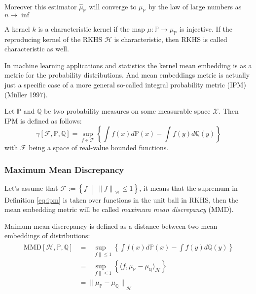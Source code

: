Moreover this estimator $\hat{\mu}_{\mathds{P}}$  will converge to $\mu_{\mathds{P}}$ by the law of large numbers as $n \rightarrow \inf$

\begin{definition}
    A kernel $k$ is a characteristic kernel if the map $\mu: \mathds{P} \rightarrow \mu_{\mathds{P}}$ is injective. If the reproducing kernel of the RKHS $\mathscr{H}$ is characteristic, then RKHS is called characteristic as well. 
\end{definition}

In machine learning applications and statistics the kernel mean embedding is as a metric for the probability distributions. And mean embeddings metric is actually just a specific case of a more general so-called integral probability metric (IPM) (Müller 1997). 

\begin{definition}[IPM]
    Let $\mathds{P}$ and  $\mathds{Q}$ be two probability measures on some measurable space $\mathcal{X}$. Then IPM is defined as follows:
    \begin{equation}
        \gamma [\mathcal{F}, \mathds{P}, \mathds{Q}] = \sup_{f\in \mathcal{F}} \left\{ \int f(x) d\mathds{P}(x) -  \int f(y) d\mathds{Q}(y) \right\}
    \end{equation}
    with $\mathcal{F}$ being a space of real-value bounded functions.
    \label{eq:ipm}
\end{definition}

\subsubsection{Maximum Mean Discrepancy}

Let's assume that $\mathcal{F} := \left\{f \;\middle| \;{\lVert f \rVert}_{\mathscr{H}} \leq 1\right\}$, it means that the supremum in Definition \ref{eq:ipm} is taken over functions in the unit ball in RKHS, then the mean embedding metric will be called \textit{maximum mean discrepancy} (MMD). 

\begin{definition}[IPM]
    Maimum mean discrepancy is defined as a distance between two mean embeddings of distributions:
    \begin{align}
        \begin{split}
            \textrm{MMD} [\mathscr{H}, \mathds{P}, \mathds{Q}] & = \sup_{ \lVert f \rVert \leq 1} \left\{ \int f(x) d\mathds{P}(x) -  \int f(y) d\mathds{Q}(y) \right\} \\ 
            & = \sup_{ \lVert f \rVert \leq 1} \left\{ \langle f, \mu_{\mathds{P}} - \mu_{\mathds{Q}} \rangle_{\mathscr{H}} \right\} \\
            & = {\lVert \mu_{\mathds{P}} - \mu_{\mathds{Q}} \rVert }_{\mathscr{H}}
        \end{split}
    \end{align}
    \label{eq:mmd}
\end{definition}

